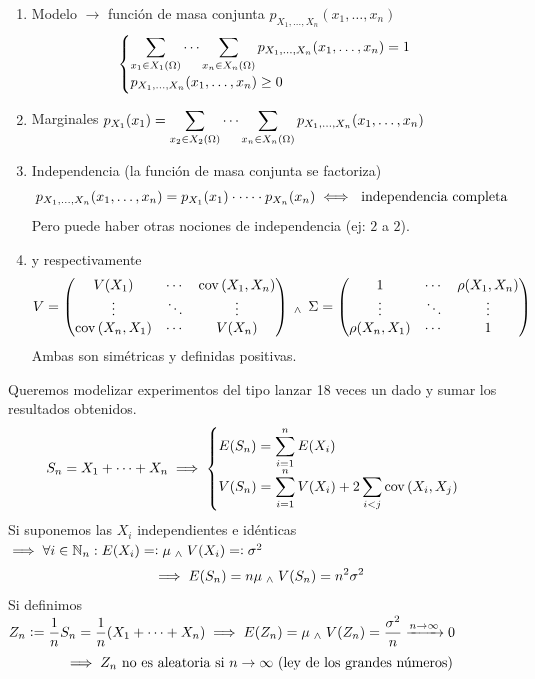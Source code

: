\begin{enumerate}
	\item Modelo $\longrightarrow$ función de masa conjunta $p_{X_1, \dots, X_n} (x_1,
		      \dots, x_n)$
	      \[\begin{cases}
			      \displaystyle \sum_{x_1\in X_1(\Omega)}\cdots\sum_{x_n\in X_n(\Omega)} p_{X_1, \dots, X_n} (x_1, \dots, x_n) = 1 \\
			      p_{X_1, \dots, X_n} (x_1, \dots, x_n) \geq 0
		      \end{cases}\]
	\item Marginales $\displaystyle p_{X_1}(x_1)=\sum_{x_2 \in X_2(\Omega)} \cdots \sum_{x_n \in
			      X_n(\Omega)} p_{X_1, \dots, X_n} (x_1, \dots, x_n)$
	\item Independencia (la función de masa conjunta se factoriza)
	      \[p_{X_1, \dots, X_n} (x_1, \dots, x_n) = p_{X_1}(x_1) \cdot \cdots \cdot p_{X_n}(x_n) \iff \text{ independencia completa}\]
	      Pero puede haber otras nociones de independencia (ej: $2$ a $2$).
	\item {} y  respectivamente
	      \[V = \begin{pmatrix}
			      V(X_1)         & \cdots & \operatorname{cov}\left(X_1, X_n\right) \\
			      \vdots         & \ddots & \vdots         \\
			      \operatorname{cov}\left(X_n, X_1\right) & \cdots & V(X_n)
		      \end{pmatrix} \; _{\wedge} \; \, \Sigma = \begin{pmatrix}
			      1              & \cdots & \rho(X_1, X_n) \\
			      \vdots         & \ddots & \vdots         \\
			      \rho(X_n, X_1) & \cdots & 1
		      \end{pmatrix}\]
	      Ambas son simétricas y definidas positivas.
\end{enumerate}
\begin{ejem}
	Queremos modelizar experimentos del tipo lanzar 18 veces un dado y sumar los resultados obtenidos.
	\[S_n=X_1+\cdots+X_n \implies \begin{cases}
			\displaystyle E(S_n) = \sum_{i=1}^n E(X_i) \\
			\displaystyle V(S_n) = \sum_{i=1}^n V(X_i) + 2\sum_{i<j} \operatorname{cov}\left(X_i, X_j\right)
		\end{cases}\]
	Si suponemos las $X_i$ independientes e idénticas $\implies \forall i \in \mathbb{N}_n
		: E(X_i)=\vcentcolon \mu \; _{\wedge} \; V(X_i)=\vcentcolon \sigma^2$
	\[\implies E(S_n) = n\mu \; _{\wedge} \; V(S_n)=n^2\sigma^2\]
	Si definimos $\displaystyle Z_n \vcentcolon= \frac{1}{n}S_n=\frac{1}{n}(X_1 + \cdots + X_n)
		\implies E(Z_n)=\mu \; _{\wedge} \; V(Z_n)=\frac{\sigma^2}{n} \xrightarrow{n\to\infty} 0$
	\[\implies Z_n \text{ no es aleatoria si } n\to\infty \text{ (ley de los grandes números)}\]
\end{ejem}
